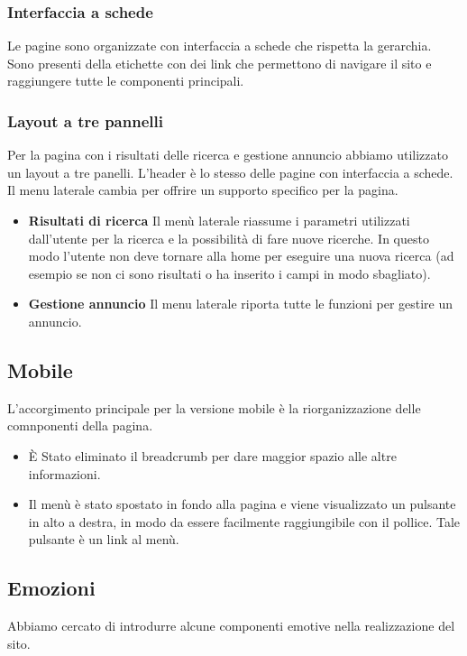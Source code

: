\documentclass[1_relazione.tex]{subfiles}
\begin{document}
    \subsubsection{Interfaccia a schede}
    Le pagine sono organizzate con interfaccia a schede che rispetta la gerarchia. Sono presenti della etichette con dei link che permettono di navigare il sito e raggiungere tutte le componenti principali.
    \subsubsection{Layout a tre pannelli}
    Per la pagina con i risultati delle ricerca e gestione annuncio abbiamo utilizzato un layout a tre panelli. L'header \`{e} lo stesso delle pagine con interfaccia a schede. Il menu laterale cambia per offrire un supporto specifico per la pagina.

    \begin{itemize}
        \item \textbf{Risultati di ricerca} Il men\`{u} laterale riassume i parametri utilizzati dall'utente per la ricerca e la possibilit\`{a} di fare nuove ricerche. In questo modo l'utente non deve tornare alla home per eseguire una nuova ricerca (ad esempio se non ci sono risultati o ha inserito i campi in modo sbagliato).
        \item \textbf{Gestione annuncio} Il menu laterale riporta tutte le funzioni per gestire un annuncio.
    \end{itemize}

    \subsection{Mobile}
    L'accorgimento principale per la versione mobile è la riorganizzazione delle comnponenti della pagina.\\
    \begin{itemize}
        \item \`{E} Stato eliminato il breadcrumb per dare maggior spazio alle altre informazioni.
        \item Il menù è stato spostato in fondo alla pagina e viene visualizzato un pulsante in alto a destra, in modo da essere facilmente raggiungibile con il pollice. Tale pulsante è un link al menù.
    \end{itemize}



    \subsection{Emozioni}
    Abbiamo cercato di introdurre alcune componenti emotive nella realizzazione del sito.
\end{document}
